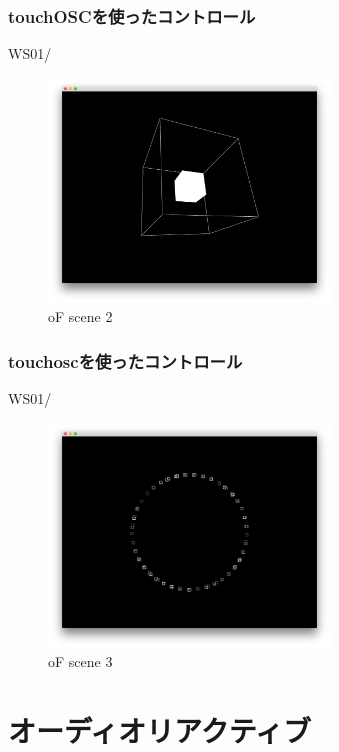 \documentclass[10pt, dvipdfmx]{beamer}
\begin{document}
        \begin{frame}
            \frametitle{touchOSCを使ったコントロール}
                \tiny
                WS01/
                \begin{figure}[htb]
                    \includegraphics[width=75mm]{images/touch-4.png}
                    \caption{oF scene 2}
                    \label{fig:touch-4}
                \end{figure}
        \end{frame}

        \begin{frame}
            \frametitle{touchoscを使ったコントロール}
                \tiny
                WS01/
                \begin{figure}[htb]
                    \includegraphics[width=75mm]{images/touch-5.png}
                    \caption{oF scene 3}
                    \label{fig:touch-5}
                \end{figure}
        \end{frame}

    \section{オーディオリアクティブ}
\end{document}
